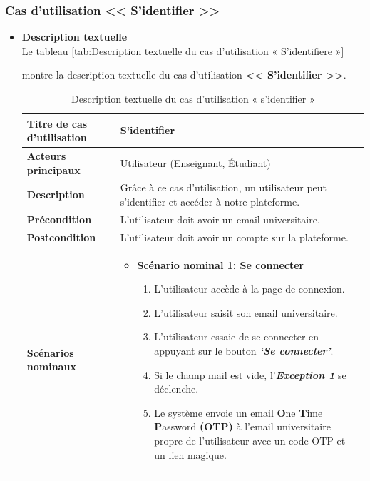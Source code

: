 \subsubsection{Cas d’utilisation << S’identifier >> }
\begin{itemize}[itemsep=1pt, parsep=1pt]
    \item \textbf{Description textuelle}\\
    Le tableau \ref{tab:Description textuelle du cas d’utilisation « S’identifiere »} 
    
    montre la description textuelle du cas d’utilisation \textbf{<< S’identifier >>}.

    \begin{longtable}{|>{\RaggedRight\arraybackslash}p{4cm}|>{\RaggedRight\arraybackslash}p{12cm}|}
        \caption{Description textuelle du cas d’utilisation « s’identifier »} \\
        \hline
        \textbf{Titre de cas d’utilisation} & \textbf{S’identifier} \\
        \hline
        \textbf{Acteurs principaux} & Utilisateur (Enseignant, Étudiant) \\
        \hline
        \textbf{Description} & Grâce à ce cas d’utilisation, un utilisateur peut s’identifier et accéder à notre plateforme. \\
        \hline
        \textbf{Précondition} & L’utilisateur doit avoir un email universitaire. \\
        \hline
        \textbf{Postcondition} & L’utilisateur doit avoir un compte sur la plateforme. \\
        \hline
        \textbf{Scénarios nominaux} & 
        \begin{itemize}[label=]
            \item \textbf{Scénario nominal 1: Se connecter}
            \begin{enumerate}
                \item L’utilisateur accède à la page de connexion.
                \item L’utilisateur saisit son email universitaire.
                \item L’utilisateur essaie de se connecter en appuyant sur le bouton \textbf{\textit{‘Se connecter’}}.
                \item Si le champ mail est vide, l’\textbf{\textit{Exception 1}} se déclenche.
                \item Le système envoie un email \textbf{O}ne \textbf{T}ime \textbf{P}assword \textbf{(OTP)} à l’email universitaire propre de l’utilisateur avec un code OTP et un lien magique.

\end{enumerate}
\end{itemize}
\end{longtable}
\end{itemize}
